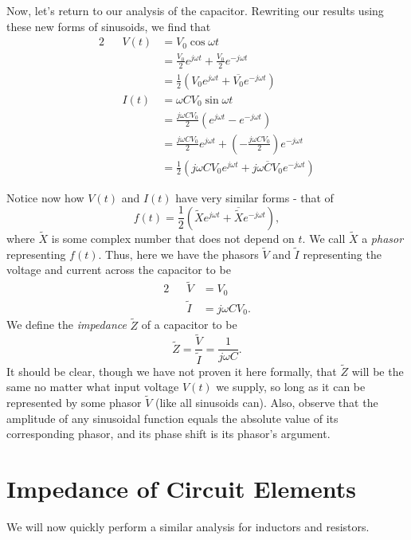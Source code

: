 \documentclass[letterpaper]{article}
\theoremstyle{remark}
\renewcommand{\tilde}[1]{\widetilde{#1}}
\newcommand{\eqn}[1]{\begin{alignat*}{2}#1\end{alignat*}}
\begin{document}
Now, let's return to our analysis of the capacitor. Rewriting our results using these new forms of sinusoids, we find that
\eqn{
    && V(t) &= V_0\cos{\omega t} \\
    &&&= \frac{V_0}{2} e^{j\omega t} + \frac{V_0}{2} e^{-j\omega t} \\
    &&&= \frac{1}{2} \left( V_0 e^{j\omega t} + \overline{V_0} e^{-j\omega t} \right) \\
    && I(t) &= \omega C V_0 \sin{\omega t} \\
    &&&= \frac{j\omega C V_0}{2} (e^{j\omega t} - e^{-j\omega t}) \\
    &&&= \frac{j\omega C V_0}{2} e^{j\omega t} + (-\frac{j\omega C V_0}{2}) e^{-j\omega t} \\
    &&&= \frac{1}{2} \left(j \omega C V_0 e^{j\omega t} + \overline{j \omega C V_0} e^{-j\omega t} \right)
}

Notice now how $V(t)$ and $I(t)$ have very similar forms - that of
\[
    f(t) = \frac{1}{2} \left(\tilde{X}e^{j\omega t} + \overline{\tilde{X}} e^{-j\omega t} \right),
\]
where $\tilde{X}$ is some complex number that does not depend on $t$. We call $\tilde{X}$ a \emph{phasor} representing $f(t)$. Thus, here we have the phasors $\tilde{V}$ and $\tilde{I}$ representing the voltage and current across the capacitor to be
\eqn{
    && \tilde{V} &= V_0 \\
    && \tilde{I} &= j\omega C V_0.
}
We define the \emph{impedance} $\tilde{Z}$ of a capacitor to be
\[
    \tilde{Z} = \frac{\tilde{V}}{\tilde{I}} = \frac{1}{j\omega C}.
\]
It should be clear, though we have not proven it here formally, that $\tilde{Z}$ will be the same no matter what input voltage $V(t)$ we supply, so long as it can be represented by some phasor $\tilde{V}$ (like all sinusoids can). Also, observe that the amplitude of any sinusoidal function equals the absolute value of its corresponding phasor, and its phase shift is its phasor's argument.

\section{Impedance of Circuit Elements}
We will now quickly perform a similar analysis for inductors and resistors.
\end{document}
